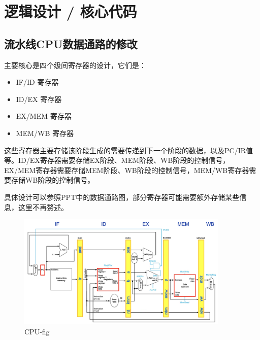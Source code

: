 \documentclass[a4paper]{article}
\begin{document}
\section{逻辑设计 / 核心代码}
\subsection{流水线CPU数据通路的修改}
主要核心是四个级间寄存器的设计，它们是：
\begin{itemize}
    \item IF/ID 寄存器
    \item ID/EX 寄存器
    \item EX/MEM 寄存器
    \item MEM/WB 寄存器
  \end{itemize}

这些寄存器主要存储该阶段生成的需要传递到下一个阶段的数据，以及PC/IR值等。ID/EX寄存器需要存储EX阶段、MEM阶段、WB阶段的控制信号，
EX/MEM寄存器需要存储MEM阶段、WB阶段的控制信号，MEM/WB寄存器需要存储WB阶段的控制信号。

具体设计可以参照PPT中的数据通路图，部分寄存器可能需要额外存储某些信息，这里不再赘述。
\begin{figure}[H]
    \centering
    \includegraphics[width=0.9\textwidth]{1.png}
    \caption{CPU-fig}
    \label{fig:test1}
\end{figure}
\end{document}
